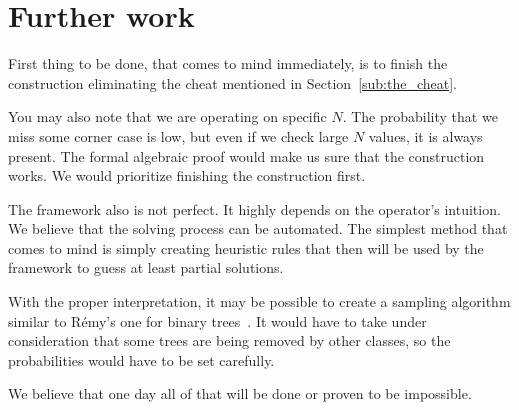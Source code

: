 \documentclass[final]{article}
\theoremstyle{definition}
\theoremstyle{remark}
\begin{document}
\section{Further work}%
\label{sec:further_work}

First thing to be done, that comes to mind immediately, is to finish the construction eliminating the cheat mentioned in Section~\ref{sub:the_cheat}.

You may also note that we are operating on specific \(N\). The probability that we miss some corner case is low, but even if we check large \(N\) values, it is always present. The formal algebraic proof would make us sure that the construction works. We would prioritize finishing the construction first.

The framework also is not perfect. It highly depends on the operator's intuition. We believe that the solving process can be automated. The simplest method that comes to mind is simply creating heuristic rules that then will be used by the framework to guess at least partial solutions.

With the proper interpretation, it may be possible to create a sampling algorithm similar to Rémy's one for binary trees~\cite{remy,note}. It would have to take under consideration that some trees are being removed by other classes, so the probabilities would have to be set carefully.

We believe that one day all of that will be done or proven to be impossible.

\clearpage

\printbibliography
\end{document}
